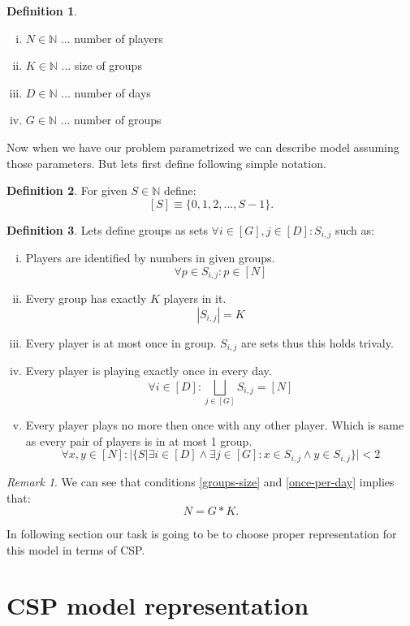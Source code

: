 \documentclass[a4paper]{article}
\theoremstyle{definition}
\newtheorem{definition}{Definition}[section]
\theoremstyle{remark}
\newtheorem*{remark}{Remark}
\newcommand{\mdef}[2]{
	\theoremstyle{definition}
	\begin{definition}{#1}
	#2
	\end{definition}
}
\newcommand{\mremark}[2]{
	\theoremstyle{remark}
	\begin{remark}{#1}
	#2
	\end{remark}
}
\begin{document}
\mdef{}{ 
	\begin{enumerate}[(i)]
		\item $ N \in \mathbb{N} $ ... number of players 
		\item $ K \in \mathbb{N} $ ... size of groups
		\item $ D \in \mathbb{N} $ ... number of days
		\item $ G \in \mathbb{N} $ ... number of groups
	\end{enumerate}
}

Now when we have our problem parametrized we can describe model assuming those parameters.
But lets first define following simple notation.
\mdef{}{
	For given $S \in \mathbb{N}$ define:
	$$ [S] \equiv \{0,1,2,...,S-1\}.  $$
 }

\mdef{}{ Lets define groups as sets $\forall i \in [G], j \in [D]: S_{i,j}$ such  as:
	\begin{enumerate}[(i)]
		\item Players are identified by numbers in given groups. $$\forall p \in S_{i,j}: p \in [N]$$ 
		\item\label{groups-size} Every group has exactly $K$ players in it. $$ |S_{i,j}| = K$$  
		\item\label{one-player} Every player is at most once in group. $S_{i,j}$ are sets thus this holds trivaly. 
		\item\label{once-per-day} Every player is playing exactly once in every day.  $$ \forall i \in [D]: \bigsqcup_{ j \in [G]} S_{i,j} = [N] $$
		\item\label{player-pairs} Every player plays no more then once with any other player. Which is same as every pair of players 
		is in at most 1 group.  $$ \forall x,y \in [N]: |\{S | \exists i \in [D] \land \exists j \in [G]: x \in S_{i,j} \land y \in S_{i,j}\}| < 2 $$
	\end{enumerate}  
}



\mremark{}{ 
We can see that conditions \ref{groups-size} and \ref{once-per-day} implies that:
$$ N = G*K. $$
}\label{insight}


In following section our task is going to be to choose proper representation for this model in terms of CSP.



\section{CSP model representation}
% 
% 
% 
% 
\end{document}
